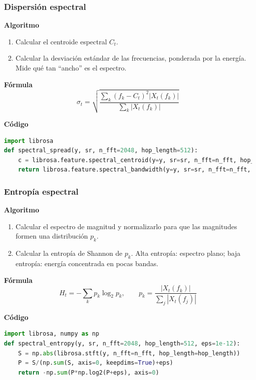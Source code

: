 \subsubsection{Dispersión espectral}
\textbf{Algoritmo} \parencite{tzanetakis2002musical, peeters2004large}
\begin{enumerate}
  \item Calcular el centroide espectral \(C_t\).
  \item Calcular la desviación estándar de las frecuencias, ponderada por la energía. Mide qué tan “ancho” es el espectro.
\end{enumerate}

\textbf{Fórmula}
\[
  \sigma_t=\sqrt{\frac{\sum_k (f_k-C_t)^2|X_t(f_k)|}{\sum_k|X_t(f_k)|}}
\]

\textbf{Código}
\begin{lstlisting}[language=Python, label={lst:spread_code}, caption={Dispersión espectral}]
import librosa
def spectral_spread(y, sr, n_fft=2048, hop_length=512):
    c = librosa.feature.spectral_centroid(y=y, sr=sr, n_fft=n_fft, hop_length=hop_length)
    return librosa.feature.spectral_bandwidth(y=y, sr=sr, n_fft=n_fft, hop_length=hop_length, centroid=c, p=2)[0]
\end{lstlisting}

\subsubsection{Entropía espectral}
\textbf{Algoritmo} \parencite{peeters2004large, muller2015fmp}
\begin{enumerate}
  \item Calcular el espectro de magnitud y normalizarlo para que las magnitudes formen una distribución \(p_k\).
  \item Calcular la entropía de Shannon de \(p_k\). Alta entropía: espectro plano; baja entropía: energía concentrada en pocas bandas.
\end{enumerate}

\textbf{Fórmula}
\[
  H_t=-\sum_{k} p_k\log_2 p_k,\qquad p_k=\frac{|X_t(f_k)|}{\sum_{j}|X_t(f_j)|}
\]

\textbf{Código}
\begin{lstlisting}[language=Python, label={lst:spec_entropy}, caption={Entropía espectral}]
import librosa, numpy as np
def spectral_entropy(y, sr, n_fft=2048, hop_length=512, eps=1e-12):
    S = np.abs(librosa.stft(y, n_fft=n_fft, hop_length=hop_length))
    P = S/(np.sum(S, axis=0, keepdims=True)+eps)
    return -np.sum(P*np.log2(P+eps), axis=0)
\end{lstlisting}

